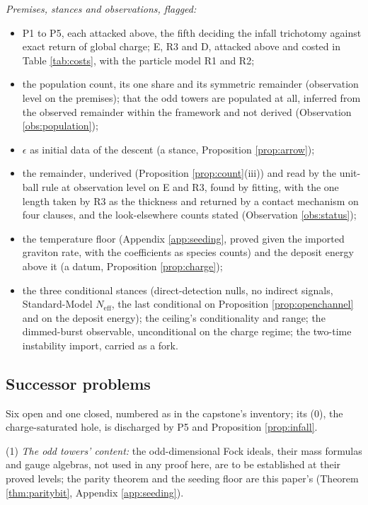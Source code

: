 \documentclass[11pt]{article}
\theoremstyle{definition}
\newcommand{\Neff}{N_{\mathrm{eff}}}
\begin{document}
\emph{Premises, stances and observations, flagged:}
\begin{itemize}\setlength{\itemsep}{1pt}
\item P1 to P5, each attacked above, the fifth deciding the infall trichotomy against exact return of global charge; E, R3 and D, attacked above and costed in Table \ref{tab:costs}, with the particle model R1 and R2;
\item the population count, its one share and its symmetric remainder (observation level on the premises); that the odd towers are populated at all, inferred from the observed remainder within the framework and not derived (Observation \ref{obs:population});
\item $\epsilon$ as initial data of the descent (a stance, Proposition \ref{prop:arrow});
\item the remainder, underived (Proposition \ref{prop:count}(iii)) and read by the unit-ball rule at observation level on E and R3, found by fitting, with the one length taken by R3 as the thickness and returned by a contact mechanism on four clauses, and the look-elsewhere counts stated (Observation \ref{obs:status});
\item the temperature floor (Appendix \ref{app:seeding}, proved given the imported graviton rate, with the coefficients as species counts) and the deposit energy above it (a datum, Proposition \ref{prop:charge});
\item the three conditional stances (direct-detection nulls, no indirect signals, Standard-Model $\Neff$, the last conditional on Proposition \ref{prop:openchannel} and on the deposit energy); the ceiling's conditionality and range; the dimmed-burst observable, unconditional on the charge regime; the two-time instability import, carried as a fork.
\end{itemize}

\subsection*{Successor problems}

Six open and one closed, numbered as in the capstone's inventory; its (0), the charge-saturated hole, is discharged by P5 and Proposition \ref{prop:infall}.

(1) \emph{The odd towers' content:} the odd-dimensional Fock ideals, their mass formulas and gauge algebras, not used in any proof here, are to be established at their proved levels; the parity theorem and the seeding floor are this paper's (Theorem \ref{thm:paritybit}, Appendix \ref{app:seeding}).
\end{document}
